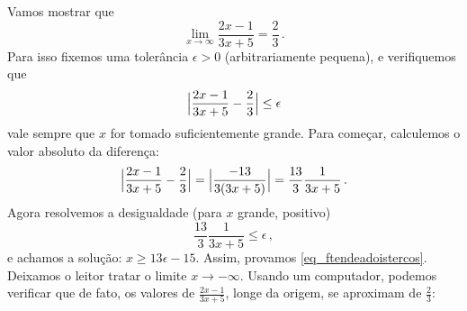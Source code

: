 \begin{exo}
\begin{sol}
%
Vamos mostrar que
\begin{equation}\label{eq_ftendeadoistercos}
\lim_{x\to \infty}\frac{2x-1}{3x+5} =\frac23\,.
\end{equation}
Para isso fixemos uma tolerância $\epsilon>0$ (arbitrariamente pequena), 
e verifiquemos que
\[ 
\Bigl|\frac{2x-1}{3x+5}-\frac23\Bigr|\leq \epsilon
\]
vale sempre que $x$ for tomado suficientemente grande.
Para começar, calculemos o valor absoluto da diferença:
\begin{equation}\label{eq_calculdifff}
\Bigl|\frac{2x-1}{3x+5}-\frac23\Bigr|=
\Bigl|\frac{-13}{3(3x+5)}\Bigr|=\frac{13}{3} 
\frac{1}{3x+5}\,.
\end{equation}
Agora resolvemos a desigualdade (para $x$ grande, positivo)
\[ \frac{13}{3} \frac{1}{3x+5}
\leq \epsilon\,,
\]
e achamos a solução: 
$x\geq 13\epsilon-15$. Assim, provamos
\eqref{eq_ftendeadoistercos}.
Deixamos o leitor tratar o limite
$x\to-\infty$.
Usando um computador, podemos verificar que de fato, os valores 
de $\frac{2x-1}{3x+5}$, longe da origem, se aproximam
de $\tfrac23$:

\begin{center}
\begin{bmlimage}\end{bmlimage}
\end{center}
\end{sol}
\end{exo}

